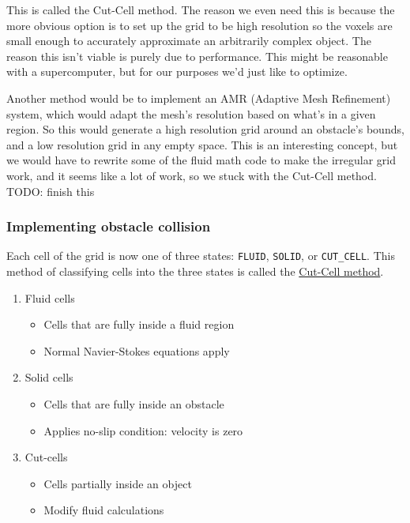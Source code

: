 \documentclass[a4paper,12pt]{article}
\begin{document}
This is called the Cut-Cell method. The reason we even need this is because
the more obvious option is to set up the grid to be high resolution so the voxels
are small enough to accurately approximate an arbitrarily complex object.
The reason this isn't viable is purely due to performance. This might be reasonable
with a supercomputer, but for our purposes we'd just like to optimize.

Another method would be to implement an AMR (Adaptive Mesh Refinement) system,
which would adapt the mesh's resolution based on what's in a given region. So this would
generate a high resolution grid around an obstacle's bounds, and a low resolution
grid in any empty space. This is an interesting concept, but we would have to
rewrite some of the fluid math code to make the irregular grid work, and it seems
like a lot of work, so we stuck with the Cut-Cell method. TODO: finish this

\subsubsection{Implementing obstacle collision}
Each cell of the grid is now one of three states: \lstinline{FLUID},
\lstinline{SOLID}, or \lstinline{CUT_CELL}. This method of classifying cells
into the three states is called the \href{https://www.sciencedirect.com/science/article/pii/S0307904X00000056}{Cut-Cell method}.
\begin{enumerate}
	\item{Fluid cells}
		\begin{itemize}
			\item{Cells that are fully inside a fluid region}
			\item{Normal Navier-Stokes equations apply}
		\end{itemize}
	\item{Solid cells}
		\begin{itemize}
			\item{Cells that are fully inside an obstacle}
			\item{Applies no-slip condition: velocity is zero}
		\end{itemize}
	\item{Cut-cells}
		\begin{itemize}
			\item{Cells partially inside an object}
			\item{Modify fluid calculations}
		\end{itemize}
\end{enumerate}
\end{document}

